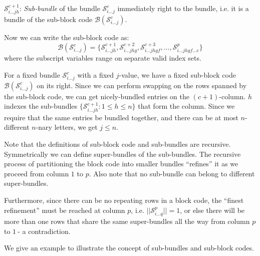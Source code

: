 \documentclass[12pt]{article}  %
\begin{document}
$\mathcal{S}^{c+1}_{i\dots j h}$: \emph{Sub-bundle} of the bundle $\mathcal{S}^c_{i\dots j}$ immediately right to the bundle, i.e. it is a bundle of the sub-block code $\mathcal{B}(\mathcal{S}^c_{i\dots j})$.

Now we can write the sub-block code as:
$$\mathcal{B}(\mathcal{S}^c_{i\dots j}) = \{
\mathcal{S}^{c+1}_{i\dots j h}, 
\mathcal{S}^{c+2}_{i\dots j h g}, 
\mathcal{S}^{c+3}_{i\dots j h g f}, 
\dots, 
\mathcal{S}^{p}_{i\dots j h g f \dots e}
\}$$
where the subscript variables range on separate valid index sets.

For a fixed bundle $\mathcal{S}^c_{i\dots j}$ with a fixed $j$-value, we have a fixed sub-block code $\mathcal{B}(\mathcal{S}^c_{i\dots j})$ on its right. Since we can perform swapping on the rows spanned by the sub-block code, we can get nicely-bundled entries on the $(c+1)$-column. $h$ indexes the sub-bundles $\{\mathcal{S}^{c+1}_{i\dots j h} : 1 \leq h \leq n \}$ that form the column. Since we require that the same entries be bundled together, and there can be at most $n$-different $n$-nary letters, we get $j \leq n$.


Note that the definitions of sub-block code and sub-bundles are recursive. Symmetrically we can define super-bundles of the sub-bundles. The recursive process of partitioning the block code into smaller bundles ``refines'' it as we proceed from column $1$ to $p$. Also note that no sub-bundle can belong to different super-bundles. 

Furthermore, since there can be no repeating rows in a block code, the ``finest refinement'' must be reached at column $p$, i.e. $||\mathcal{S}^p_{i\dots q}|| = 1$, or else there will be more than one rows that share the same super-bundles all the way from column $p$ to $1\ $-  a contradiction.


We give an example to illustrate the concept of sub-bundles and sub-block codes.
\end{document}
